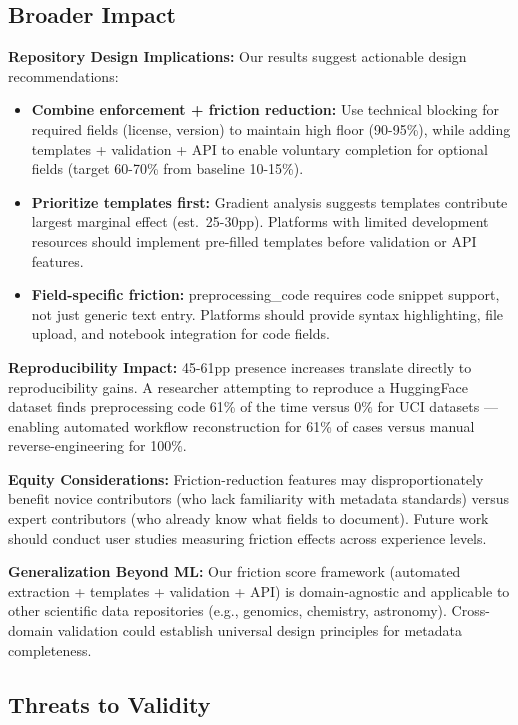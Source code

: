 \subsection{Broader Impact}

\textbf{Repository Design Implications:} Our results suggest actionable design recommendations:
\begin{itemize}
\item \textbf{Combine enforcement + friction reduction:} Use technical blocking for required fields (license, version) to maintain high floor (90-95\%), while adding templates + validation + API to enable voluntary completion for optional fields (target 60-70\% from baseline 10-15\%).
\item \textbf{Prioritize templates first:} Gradient analysis suggests templates contribute largest marginal effect (est.\ 25-30pp). Platforms with limited development resources should implement pre-filled templates before validation or API features.
\item \textbf{Field-specific friction:} preprocessing\_code requires code snippet support, not just generic text entry. Platforms should provide syntax highlighting, file upload, and notebook integration for code fields.
\end{itemize}

\textbf{Reproducibility Impact:} 45-61pp presence increases translate directly to reproducibility gains. A researcher attempting to reproduce a HuggingFace dataset finds preprocessing code 61\% of the time versus 0\% for UCI datasets --- enabling automated workflow reconstruction for 61\% of cases versus manual reverse-engineering for 100\%.

\textbf{Equity Considerations:} Friction-reduction features may disproportionately benefit novice contributors (who lack familiarity with metadata standards) versus expert contributors (who already know what fields to document). Future work should conduct user studies measuring friction effects across experience levels.

\textbf{Generalization Beyond ML:} Our friction score framework (automated extraction + templates + validation + API) is domain-agnostic and applicable to other scientific data repositories (e.g., genomics, chemistry, astronomy). Cross-domain validation could establish universal design principles for metadata completeness.

\subsection{Threats to Validity}

